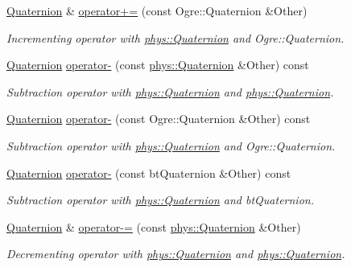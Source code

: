 \begin{DoxyCompactItemize}
\hyperlink{classphys_1_1Quaternion}{Quaternion} \& \hyperlink{classphys_1_1Quaternion_ada6772fd05ec9c8d50b8a25ece3d1c5b}{operator+=} (const Ogre::Quaternion \&Other)
\begin{DoxyCompactList}\small\item\em Incrementing operator with \hyperlink{classphys_1_1Quaternion}{phys::Quaternion} and Ogre::Quaternion. \item\end{DoxyCompactList}\item 
\hyperlink{classphys_1_1Quaternion}{Quaternion} \hyperlink{classphys_1_1Quaternion_abab2d787eefc90bbc6710091a5a79234}{operator-\/} (const \hyperlink{classphys_1_1Quaternion}{phys::Quaternion} \&Other) const 
\begin{DoxyCompactList}\small\item\em Subtraction operator with \hyperlink{classphys_1_1Quaternion}{phys::Quaternion} and \hyperlink{classphys_1_1Quaternion}{phys::Quaternion}. \item\end{DoxyCompactList}\item 
\hyperlink{classphys_1_1Quaternion}{Quaternion} \hyperlink{classphys_1_1Quaternion_a01c5412ce8f1ebb212c9afd7e19feb1e}{operator-\/} (const Ogre::Quaternion \&Other) const 
\begin{DoxyCompactList}\small\item\em Subtraction operator with \hyperlink{classphys_1_1Quaternion}{phys::Quaternion} and Ogre::Quaternion. \item\end{DoxyCompactList}\item 
\hyperlink{classphys_1_1Quaternion}{Quaternion} \hyperlink{classphys_1_1Quaternion_aca49f84681f836545c30c0b42480dccc}{operator-\/} (const btQuaternion \&Other) const 
\begin{DoxyCompactList}\small\item\em Subtraction operator with \hyperlink{classphys_1_1Quaternion}{phys::Quaternion} and btQuaternion. \item\end{DoxyCompactList}\item 
\hyperlink{classphys_1_1Quaternion}{Quaternion} \& \hyperlink{classphys_1_1Quaternion_a66086148dd9154e3e3e0b46bacafe0f7}{operator-\/=} (const \hyperlink{classphys_1_1Quaternion}{phys::Quaternion} \&Other)
\begin{DoxyCompactList}\small\item\em Decrementing operator with \hyperlink{classphys_1_1Quaternion}{phys::Quaternion} and \hyperlink{classphys_1_1Quaternion}{phys::Quaternion}. \item\end{DoxyCompactList}\item 

\end{DoxyCompactItemize}
